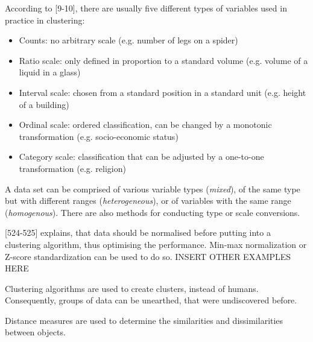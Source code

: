 According to \textcite{hartigan1975clustering}[9-10], there are usually five different types of variables used in practice in clustering:
\begin{itemize}
  \item Counts: no arbitrary scale (e.g. number of legs on a spider) 
  \item Ratio scale: only defined in proportion to a standard volume (e.g. volume of a liquid in a glass)
  \item Interval scale: chosen from a standard position in a standard unit (e.g. height of a building)
  \item Ordinal scale: ordered classification, can be changed by a monotonic transformation (e.g. socio-economic status)
  \item Category scale: classification that can be adjusted by a one-to-one transformation (e.g. religion)
\end{itemize}
A data set can be comprised of various variable types (\textit{mixed}), of the same type but with different ranges (\textit{heterogeneous}), or of variables with the same range (\textit{homogenous}). There are also methods for conducting type or scale conversions.



\textcite{DataMiningAndPredictiveAnalytics}[524-525] explains, that data should be normalised before putting into a clustering algorithm, thus optimising the performance. Min-max normalization or Z-score standardization can be used to do so.
INSERT OTHER EXAMPLES HERE








Clustering algorithms are used to create clusters, instead of humans. Consequently, groups of data can be unearthed, that were undiscovered before.

Distance measures are used to determine the similarities and dissimilarities between objects. 



